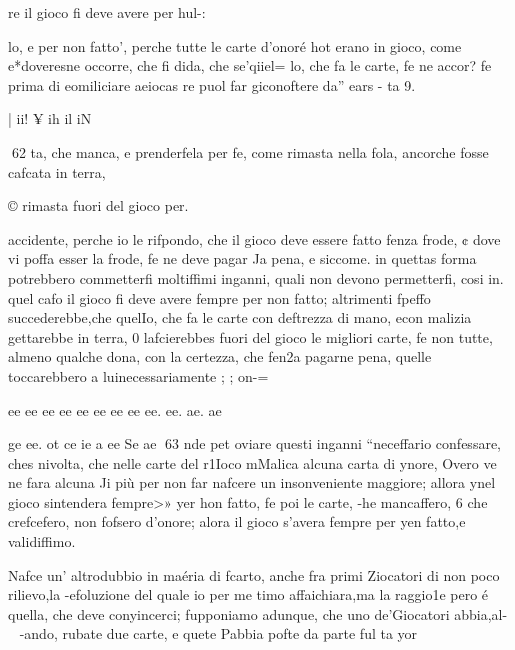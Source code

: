 \documentclass[12pt,a6paper]{article}
\begin{document}
re il gioco fi deve avere per hul-:

lo, e per non fatto’, perche tutte le carte d’onoré hot erano
in gioco, come e*doveresne
occorre, che fi dida, che se'qiiel=
lo, che fa le carte, fe ne accor?
fe prima di eomiliciare aeiocas
re puol far giconoftere da” ears
- ta 9.

 

 
  

 

 

|
ii!
¥
ih
il
iN

 

 

 

 

 
62
ta, che manca, e prenderfela
per fe, come rimasta nella fola,
ancorche fosse cafcata in terra,

© rimasta fuori del gioco per.

accidente, perche io le rifpondo, che il gioco deve essere fatto fenza frode, ¢ dove vi poffa
esser la frode, fe ne deve pagar
Ja pena, e siccome. in quettas
forma potrebbero commetterfi
moltiffimi inganni, quali non
devono permetterfi, cosi in.
quel cafo il gioco fi deve avere
fempre per non fatto; altrimenti fpeffo succederebbe,che quelIo, che fa le carte con deftrezza
di mano, econ malizia gettarebbe in terra, 0 lafcierebbes
fuori del gioco le migliori carte, fe non tutte, almeno qualche
dona, con la certezza, che fen2a pagarne pena, quelle toccarebbero a luinecessariamente ;
; on-=

ee ee ee ee ee ee ee ee ee. ee. ae. ae

ge ee. ot ce ie a ee Se ae
63
nde pet oviare questi inganni
“neceffario confessare, ches
nivolta, che nelle carte del
r1Ioco mMalica alcuna carta di
ynore, Overo ve ne fara alcuna
Ji più per non far nafcere un insonveniente maggiore; allora
ynel gioco sintendera fempre>»
yer hon fatto, fe poi le carte,
-he mancaffero, 6 che crefcefero, non fofsero d’onore; alora il gioco s’avera fempre per
yen fatto,e validiffimo.

Nafce un’ altrodubbio in maéria di fcarto, anche fra primi
Ziocatori di non poco rilievo,la
-efoluzione del quale io per me
timo affaichiara,ma la raggio1e pero é quella, che deve conyincerci; fupponiamo adunque,
che uno de’Giocatori abbia,al-~
-ando, rubate due carte, e quete Pabbia pofte da parte ful ta
yor
 

 

 

 
\end{document}
